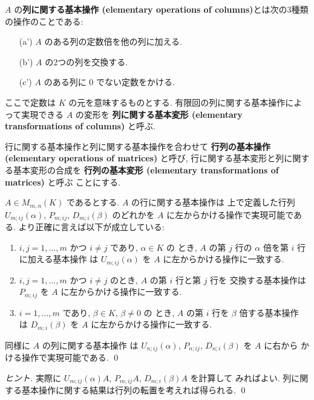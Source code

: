 \documentclass[12pt,twoside]{jarticle}
\begin{document}
$A$ の{\bf 列に関する基本操作 (elementary operations of columns)}とは次の3種類
の操作のことである:
\begin{enumerate}
\item[(a')] $A$ のある列の定数倍を他の列に加える.
\item[(b')] $A$ の2つの列を交換する.
\item[(c')] $A$ のある列に $0$ でない定数をかける.
\end{enumerate}
ここで定数は $K$ の元を意味するものとする.
有限回の列に関する基本操作によって実現できる $A$ の変形を
{\bf 列に関する基本変形 (elementary transformations of columns)} と呼ぶ.

行に関する基本操作と列に関する基本操作を合わせて
{\bf 行列の基本操作 (elementary operations of matrices)} と呼び,
行に関する基本変形と列に関する基本変形の合成を
{\bf 行列の基本変形 (elementary transformations of matrices)} と呼ぶ
ことにする.

\begin{question}[行列の基本操作の可逆な行列の積による実現]
  \label{q:elem-op}
  $A\in M_{m,n}(K)$ であるとする.
  $A$ の行に関する基本操作は
  上で定義した行列 $U_{m;ij}(\alpha)$, $P_{m;ij}$, $D_{m;i}(\beta)$ 
  のどれかを $A$ に左からかける操作で実現可能である.  
  より正確に言えば以下が成立している:
  \begin{enumerate}
  \item $i,j=1,\ldots,m$ かつ $i\ne j$ であり, $\alpha\in K$ の
    とき, $A$ の第 $j$ 行の $\alpha$ 倍を第 $i$ 行に加える基本操作
    は $U_{m;ij}(\alpha)$ を $A$ に左からかける操作に一致する.
  \item $i,j=1,\ldots,m$ かつ $i\ne j$ のとき, $A$ の第 $i$ 行と第 $j$ 行を
    交換する基本操作は $P_{m;ij}$ を $A$ に左からかける操作に一致する.
  \item $i=1,\ldots,m$ であり, $\beta\in K$, $\beta\ne 0$ の
    とき, $A$ の第 $i$ 行を $\beta$ 倍する基本操作
    は $D_{m;i}(\beta)$ を $A$ に左からかける操作に一致する.
  \end{enumerate}
  同様に   $A$ の列に関する基本操作
  は $U_{n;ij}(\alpha)$, $P_{n;ij}$, $D_{n;i}(\beta)$ を $A$ に右から
  かける操作で実現可能である. 
  \qed
\end{question}

\begin{proof}[ヒント]
  実際に $U_{m;ij}(\alpha)A$, $P_{m;ij}A$, $D_{m;i}(\beta)A$ を計算して
  みればよい. 列に関する基本操作に関する結果は行列の転置を考えれば得られる.
  \qed
\end{proof}
\end{document}

